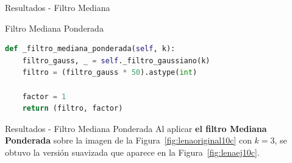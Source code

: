\documentclass{beamer}
\begin{document}
\begin{frame}[fragile]{Resultados - Filtro Mediana}
\begin{minipage}{0.45\linewidth}
		\label{fig:lenaej10b}
	\end{minipage}
\end{frame}

\begin{frame}[fragile]{Filtro Mediana Ponderada}
	\justifying
	
	\begin{lstlisting}[language=Python]
def _filtro_mediana_ponderada(self, k):
	filtro_gauss, _ = self._filtro_gaussiano(k)
	filtro = (filtro_gauss * 50).astype(int)
	
	factor = 1
	return (filtro, factor)
	\end{lstlisting}
\end{frame}

\begin{frame}[fragile]{Resultados - Filtro Mediana Ponderada}
	\justifying
	Al aplicar \textcolor{unahurverde}{\textbf{el filtro Mediana Ponderada}} sobre la imagen de la Figura~\ref{fig:lenaoriginal10c} con $k=3$,  
	se obtuvo la versión suavizada que aparece en la Figura~\ref{fig:lenaej10c}.
	

\end{frame}
\end{document}

